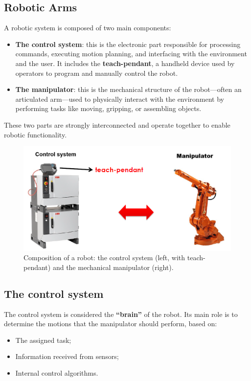 \subsection{Robotic Arms}

A robotic system is composed of two main components:

\begin{itemize}
  \item \textbf{The control system}: this is the electronic part responsible for processing commands, executing motion planning, and interfacing with the environment and the user. It includes the \textbf{teach-pendant}, a handheld device used by operators to program and manually control the robot.
  \item \textbf{The manipulator}: this is the mechanical structure of the robot—often an articulated arm—used to physically interact with the environment by performing tasks like moving, gripping, or assembling objects.
\end{itemize}

These two parts are strongly interconnected and operate together to enable robotic functionality.

\begin{figure}[H]
  \centering
  \includegraphics[width=0.7\linewidth]{imgs/robotic_arm_structure.png}
  \caption{Composition of a robot: the control system (left, with teach-pendant) and the mechanical manipulator (right).}
\end{figure}

\hfill

\subsection{The control system}

The control system is considered the \textbf{``brain''} of the robot. Its main role is to determine the motions that the manipulator should perform, based on:
\begin{itemize}
  \item The assigned task;
  \item Information received from sensors;
  \item Internal control algorithms.
\end{itemize}

